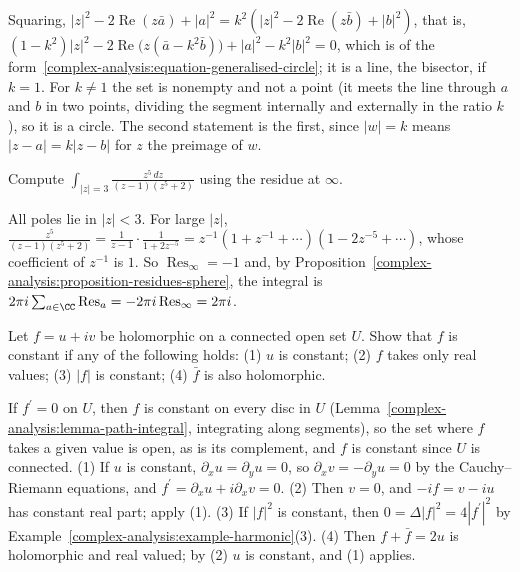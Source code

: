 \begin{solution}
Squaring, $|z|^2 - 2\operatorname{Re}(z\bar a) + |a|^2 = k^2(|z|^2 - 2\operatorname{Re}(z\bar b) + |b|^2)$, that is,
$(1 - k^2)|z|^2 - 2\operatorname{Re}\bigl(z(\bar a - k^2\bar b)\bigr) + |a|^2 - k^2|b|^2 = 0$, which is of the form~\eqref{complex-analysis:equation-generalised-circle}; it is a line, the bisector, if $k = 1$. For $k \neq 1$ the
set is nonempty and not a point (it meets the line through $a$ and $b$ in two points, dividing the segment internally and externally in the ratio $k$), so it is a circle. The second statement is the first, since
$|w| = k$ means $|z - a| = k|z - b|$ for $z$ the preimage of $w$.
\end{solution}

\begin{exercise}\label{complex-analysis:exercise-residue-infinity}
Compute $\int_{|z| = 3}\frac{z^{5}\,dz}{(z - 1)(z^5 + 2)}$ using the residue at $\infty$.
\end{exercise}

\begin{solution}
All poles lie in $|z| < 3$. For large $|z|$, $\frac{z^5}{(z - 1)(z^5 + 2)} = \frac{1}{z - 1}\cdot\frac{1}{1 + 2z^{-5}} = z^{-1}(1 + z^{-1} + \cdots)(1 - 2z^{-5} + \cdots)$, whose coefficient of $z^{-1}$ is $1$. So
$\operatorname{Res}_\infty = -1$ and, by Proposition~\ref{complex-analysis:proposition-residues-sphere}, the integral is $2\pi i\sum_{a \in \CC}\operatorname{Res}_a = -2\pi i\operatorname{Res}_\infty = 2\pi i$.
\end{solution}

\begin{exercise}\label{complex-analysis:exercise-constant-modulus}
Let $f = u + iv$ be holomorphic on a connected open set $U$. Show that $f$ is constant if any of the following holds: (1) $u$ is constant; (2) $f$ takes only real values; (3) $|f|$ is constant; (4) $\bar f$ is
also holomorphic.
\end{exercise}

\begin{solution}
If $f^{\prime} = 0$ on $U$, then $f$ is constant on every disc in $U$ (Lemma~\ref{complex-analysis:lemma-path-integral}, integrating along segments), so the set where $f$ takes a given value is open, as is its
complement, and $f$ is constant since $U$ is connected. (1) If $u$ is constant, $\partial_xu = \partial_yu = 0$, so $\partial_xv = -\partial_yu = 0$ by the Cauchy--Riemann equations, and
$f^{\prime} = \partial_xu + i\partial_xv = 0$. (2) Then $v = 0$, and $-if = v - iu$ has constant real part; apply (1). (3) If $|f|^2$ is constant, then $0 = \Delta|f|^2 = 4|f^{\prime}|^2$ by
Example~\ref{complex-analysis:example-harmonic}(3). (4) Then $f + \bar f = 2u$ is holomorphic and real valued; by (2) $u$ is constant, and (1) applies.
\end{solution}

